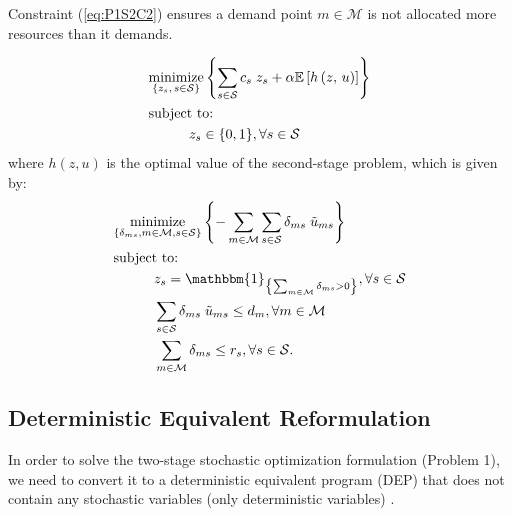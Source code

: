\documentclass[conference]{IEEEtran}
\begin{document}
Constraint (\ref{eq:P1S2C2}) ensures a demand point $m \in \mathcal{M}$ is not allocated more resources than it demands.

\vspace{3mm}
\begin{tcolorbox}[title = Problem 1 (Two-Stage Stochastic Optimization Problem)]
\begin{align}
& \underset{\left\{z_s,\, s \in \mathcal{S}\right\}}{\text{minimize}} \left\{ \sum_{s \in \mathcal{S}} c_s \; z_s + \alpha \mathbb{E}\left[ h\left( z,\, u \right) \right] \right\} \label{eq:P1S1}\\
& \text{subject to:}  \nonumber \\
& \hspace{0.4in} z_s \in \{0, 1\}, \forall s \in \mathcal{S} \label{eq:P1S1C1}
\end{align}
where $h(z, u)$ is the optimal value of the second-stage problem, which is given by:
\begin{align}
& \underset{\left\{\substack{\delta_{ms}, m \in \mathcal{M}, s \in \mathcal{S}}\right\}}{\mathrm{minimize}} \left\{ - \sum_{m \in \mathcal{M}} \sum_{s \in \mathcal{S}} \delta_{ms} \; \tilde{u}_{ms} \right\} \label{eq:P1S2}\\
& \text{subject to:}  \nonumber \\
& \hspace{0.4in} z_s = \mathbbm{1}_{\left\{\sum_{m \in \mathcal{M}} \delta_{ms} > 0\right\}}, \forall s \in \mathcal{S} \label{eq:P1S2C1}\\
& \hspace{0.4in} \sum_{s \in \mathcal{S}} \delta_{ms} \; \tilde{u}_{ms} \leq d_m, \forall m \in \mathcal{M} \label{eq:P1S2C2}\\
& \hspace{0.4in} \sum_{m \in \mathcal{M}} \delta_{ms} \leq r_s, \forall s \in \mathcal{S}. \label{eq:P1S2C3}
\end{align}
\end{tcolorbox}

\subsection{Deterministic Equivalent Reformulation} \label{subsec:dep}

In order to solve the two-stage stochastic optimization formulation (Problem 1), we need to convert it to a deterministic equivalent program (DEP) that does not contain any stochastic variables (only deterministic variables) \cite{stochprogramming}.
\end{document}
